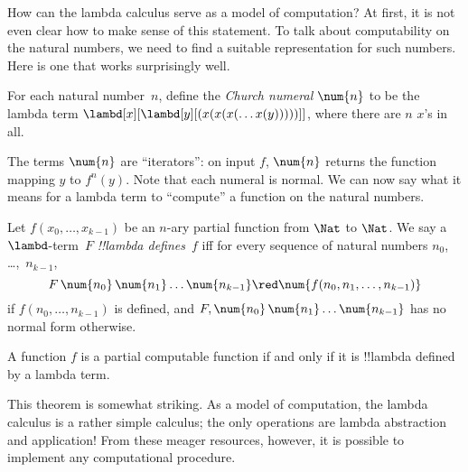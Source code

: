 \documentclass[../../../include/open-logic-section]{subfiles}
\begin{document}

How can the lambda calculus serve as a model of computation? At first,
it is not even clear how to make sense of this statement. To talk
about computability on the natural numbers, we need to find a suitable
representation for such numbers. Here is one that works surprisingly
well.

\begin{defn}
For each natural number~$n$, define the \emph{Church numeral}
$\num{n}$ to be the lambda term $\lambd[x][\lambd[y][(x(x(x(\dots
x(y)))))]]$, where there are $n$ $x$'s in all.
\end{defn}

The terms $\num{n}$ are ``iterators'': on input $f$, $\num{n}$ returns
the function mapping $y$ to $f^n(y)$. Note that each numeral is
normal. We can now say what it means for a lambda term to ``compute''
a function on the natural numbers.

\begin{defn}
Let $f(x_0, \dots, x_{k-1})$ be an $n$-ary partial function from $\Nat$
to $\Nat$. We say a $\lambd$-term~$F$ \emph{!!{lambda define}s}~$f$ iff for every
sequence of natural numbers $n_0$, \dots,~$n_{k-1}$,
\[
F\, \num{n_0}\, \num{n_1} \dots \num{n_{k-1}} \red \num{f(n_0, n_1, \dots,
  n_{k-1})}
\]
if $f(n_0, \dots, n_{k-1})$ is defined, and $F, \num{n_0}\, \num{n_1}
\dots \num{n_{k-1}}$ has no normal form otherwise.
\end{defn}

\begin{thm}
A function $f$ is a partial computable function if and only if it is
!!{lambda defined} by a lambda term.
\end{thm}

\begin{explain}
This theorem is somewhat striking. As a model of computation, the
lambda calculus is a rather simple calculus; the only operations are
lambda abstraction and application!{} From these meager resources,
however, it is possible to implement any computational procedure.
\end{explain}
\end{document}
